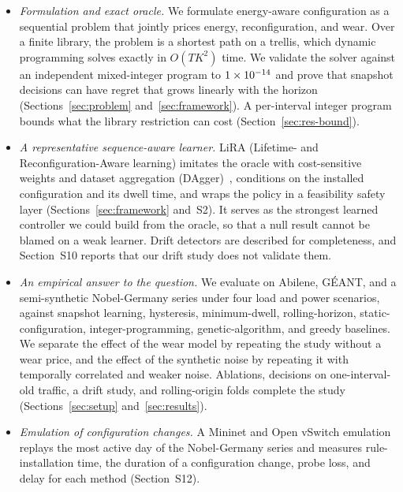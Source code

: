 \documentclass[5p,times]{elsarticle}
\begin{document}
\begin{itemize}
\item \emph{Formulation and exact oracle.} We formulate energy-aware configuration as a sequential problem that jointly prices energy, reconfiguration, and wear. Over a finite library, the problem is a shortest path on a trellis, which dynamic programming solves exactly in $O(TK^2)$ time. We validate the solver against an independent mixed-integer program to $1\times10^{-14}$ and prove that snapshot decisions can have regret that grows linearly with the horizon (Sections~\ref{sec:problem} and~\ref{sec:framework}). A per-interval integer program bounds what the library restriction can cost (Section~\ref{sec:res-bound}).
\item \emph{A representative sequence-aware learner.} LiRA (Lifetime- and Reconfiguration-Aware learning) imitates the oracle with cost-sensitive weights and dataset aggregation (DAgger)~\cite{ross2011dagger}, conditions on the installed configuration and its dwell time, and wraps the policy in a feasibility safety layer (Sections~\ref{sec:framework} and~S2). It serves as the strongest learned controller we could build from the oracle, so that a null result cannot be blamed on a weak learner. Drift detectors are described for completeness, and Section~S10 reports that our drift study does not validate them.
\item \emph{An empirical answer to the question.} We evaluate on Abilene, G\'{E}ANT, and a semi-synthetic Nobel-Germany series under four load and power scenarios, against snapshot learning, hysteresis, minimum-dwell, rolling-horizon, static-configuration, integer-programming, genetic-algorithm, and greedy baselines. We separate the effect of the wear model by repeating the study without a wear price, and the effect of the synthetic noise by repeating it with temporally correlated and weaker noise. Ablations, decisions on one-interval-old traffic, a drift study, and rolling-origin folds complete the study (Sections~\ref{sec:setup} and~\ref{sec:results}).
\item \emph{Emulation of configuration changes.} A Mininet and Open vSwitch emulation replays the most active day of the Nobel-Germany series and measures rule-installation time, the duration of a configuration change, probe loss, and delay for each method (Section~S12).
\end{itemize}
\end{document}
